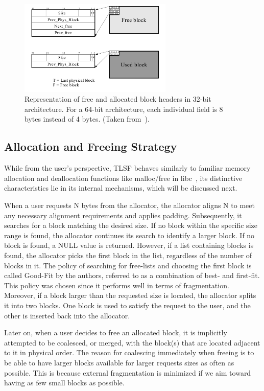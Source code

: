 
\begin{figure}[H]
    \centering
    \includegraphics[width=0.65\textwidth]{figures/blockheader_reference.png}
    \caption{Representation of free and allocated block headers in 32-bit architecture. For a 64-bit architecture, each individual field is 8 bytes instead of 4 bytes. (Taken from~\cite{TLSF}).}
    \label{fig:blockheader_reference}
\end{figure}

\subsection{Allocation and Freeing Strategy}

While from the user's perspective, TLSF behaves similarly to familiar memory allocation and deallocation functions like malloc/free in libc~\cite{mallocman}, its distinctive characteristics lie in its internal mechanisms, which will be discussed next.

When a user requests N bytes from the allocator, the allocator aligns N to meet any necessary alignment requirements and applies padding. Subsequently, it searches for a block matching the desired size. If no block within the specific size range is found, the allocator continues its search to identify a larger block. If no block is found, a NULL value is returned. However, if a list containing blocks is found, the allocator picks the first block in the list, regardless of the number of blocks in it. The policy of searching for free-lists and choosing the first block is called Good-Fit by the authors, referred to as a combination of best- and first-fit. This policy was chosen since it performs well in terms of fragmentation. Moreover, if a block larger than the requested size is located, the allocator splits it into two blocks. One block is used to satisfy the request to the user, and the other is inserted back into the allocator.

Later on, when a user decides to free an allocated block, it is implicitly attempted to be coalesced, or merged, with the block(s) that are located adjacent to it in physical order. The reason for coalescing immediately when freeing is to be able to have larger blocks available for larger requests sizes as often as possible. This is because external fragmentation is minimized if we aim toward having as few small blocks as possible.

